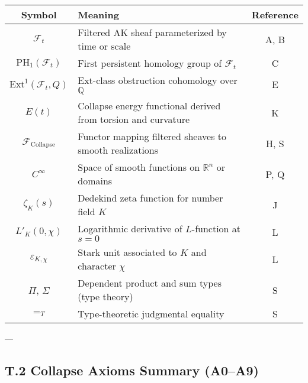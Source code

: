 \documentclass[11pt]{article}
\begin{document}
{\begin{center}
\begin{tabular}{|c|p{8cm}|c|}
\hline
\textbf{Symbol} & \textbf{Meaning} & \textbf{Reference} \\
\hline
$\mathcal{F}_t$ & Filtered AK sheaf parameterized by time or scale & A, B \\
$\mathrm{PH}_1(\mathcal{F}_t)$ & First persistent homology group of $\mathcal{F}_t$ & C \\
$\mathrm{Ext}^1(\mathcal{F}_t, Q)$ & Ext-class obstruction cohomology over $\mathbb{Q}$ & E \\
$E(t)$ & Collapse energy functional derived from torsion and curvature & K \\
$\mathcal{F}_{\mathrm{Collapse}}$ & Functor mapping filtered sheaves to smooth realizations & H, S \\
$C^\infty$ & Space of smooth functions on $\mathbb{R}^n$ or domains & P, Q \\
$\zeta_K(s)$ & Dedekind zeta function for number field $K$ & J \\
$L'_K(0,\chi)$ & Logarithmic derivative of $L$-function at $s=0$ & L \\
$\varepsilon_{K,\chi}$ & Stark unit associated to $K$ and character $\chi$ & L \\
$\Pi$, $\Sigma$ & Dependent product and sum types (type theory) & S \\
$=_T$ & Type-theoretic judgmental equality & S \\
\hline
\end{tabular}
\end{center}

---

\subsection*{T.2 Collapse Axioms Summary (A0–A9)}

}
\end{document}
